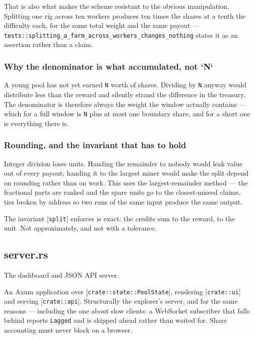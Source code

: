 \documentclass[11pt,a4paper]{article}
\begin{document}
That is also what makes the scheme resistant to the obvious manipulation.
Splitting one rig across ten workers produces ten times the shares at a
tenth the difficulty each, for the same total weight and the same payout —
\texttt{tests::splitting\_a\_farm\_across\_workers\_changes\_nothing} states it as an
assertion rather than a claim.

\subsubsection{Why the denominator is what accumulated, not `N`}

A young pool has not yet earned \texttt{N} worth of shares. Dividing by \texttt{N} anyway
would distribute less than the reward and silently strand the difference in
the treasury. The denominator is therefore always the weight the window
actually contains — which for a full window is \texttt{N} plus at most one boundary
share, and for a short one is everything there is.

\subsubsection{Rounding, and the invariant that has to hold}

Integer division loses units. Handing the remainder to nobody would leak
value out of every payout; handing it to the largest miner would make the
split depend on rounding rather than on work. This uses the largest-remainder
method — the fractional parts are ranked and the spare units go to the
closest-missed claims, ties broken by address so two runs of the same input
produce the same output.

The invariant [\texttt{split}] enforces is exact: the credits sum to the reward, to
the unit. Not approximately, and not with a tolerance.

\subsection{server.rs}
The dashboard and JSON API server.

An Axum application over [\texttt{crate::state::PoolState}], rendering
[\texttt{crate::ui}] and serving [\texttt{crate::api}]. Structurally the explorer's
server, and for the same reasons — including the one about slow clients:
a WebSocket subscriber that falls behind reports \texttt{Lagged} and is skipped
ahead rather than waited for. Share accounting must never block on a
browser.
\end{document}

